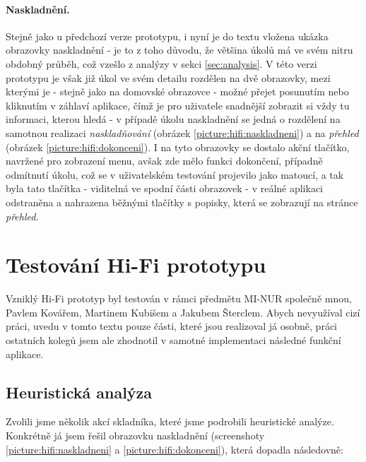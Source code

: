 \paragraph{Naskladnění.} Stejně jako u předchozí verze prototypu, i nyní je do textu vložena ukázka obrazovky naskladnění - je to z toho důvodu, že většina úkolů má ve svém nitru obdobný průběh, což vzešlo z analýzy v sekci \ref{sec:analysis}. V této verzi prototypu je však již úkol ve svém detailu rozdělen na dvě obrazovky, mezi kterými je - stejně jako na domovské obrazovce - možné přejet posunutím nebo kliknutím v záhlaví aplikace, čímž je pro uživatele snadnější zobrazit si vždy tu informaci, kterou hledá - v případě úkolu naskladnění se jedná o rozdělení na samotnou realizaci \emph{naskladňování} (obrázek \ref{picture:hifi:naskladneni}) a na \emph{přehled} (obrázek \ref{picture:hifi:dokonceni}). I na tyto obrazovky se dostalo akční tlačítko, navržené pro zobrazení menu, avšak zde mělo funkci dokončení, případně odmítnutí úkolu, což se v uživatelském testování projevilo jako matoucí, a tak byla tato tlačítka - viditelná ve spodní části obrazovek - v reálné aplikaci odstraněna a nahrazena běžnými tlačítky s popisky, která se zobrazují na stránce \emph{přehled}.


\section{Testování Hi-Fi prototypu}

Vzniklý Hi-Fi prototyp byl testován v rámci předmětu MI-NUR společně mnou, Pavlem Kovářem, Martinem Kubišem a Jakubem Šterclem. Abych nevyužíval cizí práci, uvedu v tomto textu pouze části, které jsou realizoval já osobně, práci ostatních kolegů jsem ale zhodnotil v samotné implementaci následné funkční aplikace.


\subsection{Heuristická analýza}

Zvolili jsme několik akcí skladníka, které jsme podrobili heuristické analýze. Konkrétně já jsem řešil obrazovku naskladnění (screenshoty \ref{picture:hifi:naskladneni} a \ref{picture:hifi:dokonceni}), která dopadla následovně:

